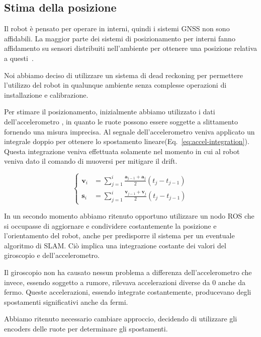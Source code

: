 \documentclass[a4paper]{article}
\begin{document}
	\subsection{Stima della posizione}\label{subsec:Posizionamento}
	Il robot è pensato per operare in interni, quindi i sistemi GNSS non sono
	affidabili.
	La maggior parte dei sistemi di posizionamento per interni fanno
	affidamento su sensori distribuiti nell'ambiente per ottenere una posizione
	relativa a questi~\cite{mendoza2019meta}.

	Noi abbiamo deciso di utilizzare un sistema di dead reckoning per
	permettere l'utilizzo del robot in qualunque ambiente senza complesse
	operazioni di installazione e calibrazione.

	Per stimare il posizionamento, inizialmente abbiamo utilizzato i dati
	dell'accelerometro \cite{positioning}, in quanto le ruote possono essere
	soggette a slittamento fornendo una misura imprecisa. Al segnale
	dell'accelerometro veniva applicato un integrale doppio per ottenere lo
	spostamento lineare(Eq.~\ref{eq:accel-integration}). Questa integrazione
	veniva effettuata solamente nel momento in cui al robot veniva dato il
	comando di muoversi per mitigare il drift.

	\begin{equation}\label{eq:accel-integration}
		\begin{cases}
			\textbf{v}_i & = \sum_{j=1}^{i} \frac{\textbf{a} _{j-1}+\textbf{a} _j}{2} \left( t_j-t_{j-1} \right) \\
			\textbf{s}_i & = \sum_{j=1}^{i} \frac{\textbf{v} _{j-1}+\textbf{v} _j}{2} \left( t_j-t_{j-1} \right) 
		\end{cases}
	\end{equation}
	
	In un secondo momento abbiamo ritenuto opportuno utilizzare un nodo ROS che
	si occupasse di aggiornare e condividere costantemente la posizione e
	l'orientamento del robot, anche per predisporre il sistema per un eventuale
	algoritmo di SLAM.  Ciò implica una integrazione costante dei valori del
	giroscopio e dell'accelerometro. 
	
	Il giroscopio non ha causato nessun problema a differenza
	dell'accelerometro che invece, essendo soggetto a rumore, rilevava
	accelerazioni diverse da 0 anche da fermo. Queste accelerazioni, essendo
	integrate costantemente, producevano degli spostamenti significativi anche
	da fermi. 
	
	Abbiamo ritenuto necessario cambiare approccio, decidendo di utilizzare gli
	encoders delle ruote per determinare gli spostamenti. 
	
\end{document}
